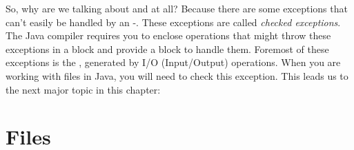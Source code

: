 
So, why are we talking about  and  at all? Because there are some exceptions that can't easily be handled by an -. These exceptions are called {\em checked exceptions}. The Java compiler requires you to enclose operations that might throw these exceptions in a  block and provide a  block to handle them. Foremost of these exceptions is the , generated by I/O (Input/Output) operations. When you are working with files in Java, you will need to check this exception. This leads us to the next major topic in this chapter:

\section{Files}


